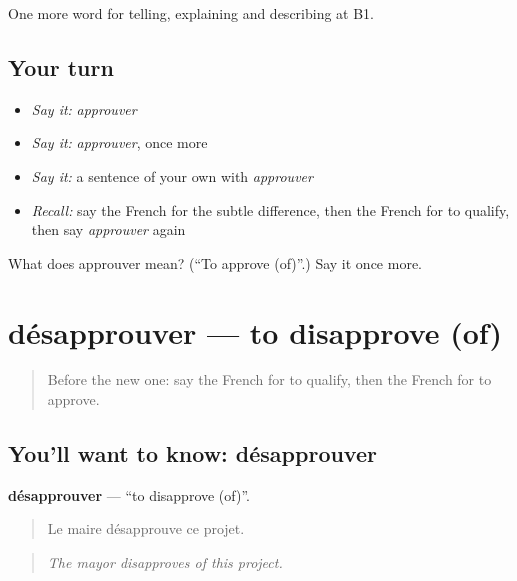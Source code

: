 \begin{grammarlens}[title={What you've built}]
One more word for telling, explaining and describing at B1.
\end{grammarlens}

\subsection*{Your turn}
\begin{itemize}
\raggedright
  \item \emph{Say it:} \emph{approuver}
  \item \emph{Say it:} \emph{approuver}, once more
  \item \emph{Say it:} a sentence of your own with \emph{approuver}
  \item \emph{Recall:} say the French for the subtle difference, then the French for to qualify, then say \emph{approuver} again
\end{itemize}

\begin{tcolorbox}[breakable,colback=teal!4,colframe=teal!35!black,title={Before you move on}]
What does approuver mean? (\textquotedblleft{}To approve (of)\textquotedblright{}.) Say it once more.
\end{tcolorbox}
\section[désapprouver]{désapprouver — to disapprove (of)}

\label{lesson:FR-C345-desapprouver}



\begin{quote}
Before the new one: say the French for to qualify, then the French for to approve.
\end{quote}

\subsection*{You'll want to know: désapprouver}
\textbf{désapprouver} — \textquotedblleft{}to disapprove (of)\textquotedblright{}.

\begin{quote}
Le maire désapprouve ce projet.
\end{quote}

\begin{quote}
\emph{The mayor disapproves of this project.}
\end{quote}

